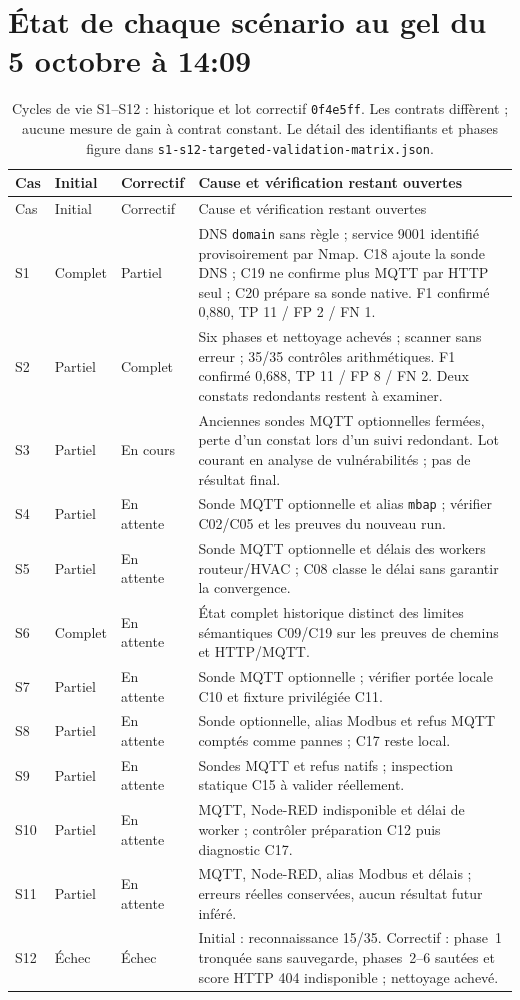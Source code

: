 \documentclass[11pt,a4paper]{article}
\newcommand{\code}[1]{{\urlstyle{tt}\nolinkurl{#1}}}
\begin{document}
\clearpage
\section{État de chaque scénario au gel du 5 octobre à 14:09}
\label{sec:etat-douze}
\small
\begin{longtable}{@{}p{9mm}p{18mm}p{24mm}p{97mm}@{}}
\caption{Cycles de vie S1--S12 : historique et lot correctif \code{0f4e5ff}. Les contrats diffèrent ; aucune mesure de gain à contrat constant. Le détail des identifiants et phases figure dans \code{s1-s12-targeted-validation-matrix.json}.}\\
\toprule Cas & Initial & Correctif & Cause et vérification restant ouvertes \\
\midrule\endfirsthead
\toprule Cas & Initial & Correctif & Cause et vérification restant ouvertes \\
\midrule\endhead
S1 & Complet & Partiel & DNS \code{domain} sans règle ; service 9001 identifié provisoirement par Nmap. C18 ajoute la sonde DNS ; C19 ne confirme plus MQTT par HTTP seul ; C20 prépare sa sonde native. F1 confirmé 0,880, TP 11 / FP 2 / FN 1. \\
S2 & Partiel & Complet & Six phases et nettoyage achevés ; scanner sans erreur ; 35/35 contrôles arithmétiques. F1 confirmé 0,688, TP 11 / FP 8 / FN 2. Deux constats redondants restent à examiner. \\
S3 & Partiel & En cours & Anciennes sondes MQTT optionnelles fermées, perte d'un constat lors d'un suivi redondant. Lot courant en analyse de vulnérabilités ; pas de résultat final. \\
S4 & Partiel & En attente & Sonde MQTT optionnelle et alias \code{mbap} ; vérifier C02/C05 et les preuves du nouveau run. \\
S5 & Partiel & En attente & Sonde MQTT optionnelle et délais des workers routeur/HVAC ; C08 classe le délai sans garantir la convergence. \\
S6 & Complet & En attente & État complet historique distinct des limites sémantiques C09/C19 sur les preuves de chemins et HTTP/MQTT. \\
S7 & Partiel & En attente & Sonde MQTT optionnelle ; vérifier portée locale C10 et fixture privilégiée C11. \\
S8 & Partiel & En attente & Sonde optionnelle, alias Modbus et refus MQTT comptés comme pannes ; C17 reste local. \\
S9 & Partiel & En attente & Sondes MQTT et refus natifs ; inspection statique C15 à valider réellement. \\
S10 & Partiel & En attente & MQTT, Node-RED indisponible et délai de worker ; contrôler préparation C12 puis diagnostic C17. \\
S11 & Partiel & En attente & MQTT, Node-RED, alias Modbus et délais ; erreurs réelles conservées, aucun résultat futur inféré. \\
S12 & Échec & Échec & Initial : reconnaissance 15/35. Correctif : phase~1 tronquée sans sauvegarde, phases~2--6 sautées et score HTTP 404 indisponible ; nettoyage achevé. \\
\bottomrule
\end{longtable}
\end{document}
